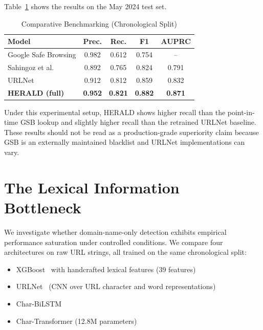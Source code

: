 \documentclass[conference]{IEEEtran}
\begin{document}
Table~\ref{tab:baseline_results} shows the results on the May 2024 test set.

\begin{table}[htbp]
\centering
\caption{Comparative Benchmarking (Chronological Split)}
\label{tab:baseline_results}

\scriptsize
\setlength{\tabcolsep}{3pt}

\begin{tabularx}{\columnwidth}{lcccc}
\toprule
\textbf{Model} &
\textbf{Prec.} &
\textbf{Rec.} &
\textbf{F1} &
\textbf{AUPRC} \\
\midrule

Google Safe Browsing & 0.982 & 0.612 & 0.754 & -- \\
Sahingoz et al.~\cite{sahingoz2019} & 0.892 & 0.765 & 0.824 & 0.791 \\
URLNet~\cite{le_urlnet} & 0.912 & 0.812 & 0.859 & 0.832 \\

\textbf{HERALD (full)} &
\textbf{0.952} &
\textbf{0.821} &
\textbf{0.882} &
\textbf{0.871} \\

\bottomrule
\end{tabularx}
\end{table}

Under this experimental setup, HERALD shows higher recall than the point-in-time GSB lookup and slightly higher recall than the retrained URLNet baseline. These results should not be read as a production-grade superiority claim because GSB is an externally maintained blacklist and URLNet implementations can vary.

\section{The Lexical Information Bottleneck}
\label{sec:bottleneck}

We investigate whether domain-name-only detection exhibits empirical performance saturation under controlled conditions. We compare four architectures on raw URL strings, all trained on the same chronological split:

\begin{itemize}
    \item XGBoost~\cite{xgboost} with handcrafted lexical features (39 features)
    \item URLNet~\cite{le_urlnet} (CNN over URL character and word representations)
    \item Char-BiLSTM
    \item Char-Transformer (12.8M parameters)
\end{itemize}
\end{document}
